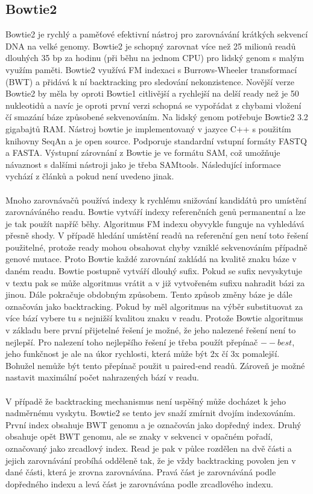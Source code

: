 \documentclass[czech,DP]{thesiskiv}
\numberwithin{equation}{section}
\begin{document}
\subsection{Bowtie2}
Bowtie2 je rychlý a paměťové efektivní nástroj pro zarovnávání krátkých sekvencí DNA na velké genomy. Bowtie2 je schopný zarovnat více než 25 milionů readů dlouhých 35 bp za hodinu (při běhu na jednom CPU) pro lidský genom s malým využím paměti. Bowtie2 využívá FM indexaci s Burrows-Wheeler transformací (BWT) a přidává k ní backtracking pro sledování nekonzistence. Novější verze Bowtie2 by měla by oproti Bowtie1 citlivější a rychlejší na delší ready než je 50 nukleotidů a navíc je oproti první verzi schopná se vypořádat z chybami vložení čí smazání báze způsobené sekvenováním. Na lidský genom potřebuje Bowtie2 3.2 gigabajtů RAM. Nástroj bowtie je implementovaný v jazyce C++ s použitím knihovny SeqAn a je open source. Podporuje standardní vstupní formáty FASTQ a FASTA.  Výstupní zárovnání z Bowtie je ve formátu SAM, což umožňuje návaznost s dalšími nástroji jako je třeba SAMtools. Následující informace vychází z článků \cite{bowtie} a \cite{bowtie2} pokud není uvedeno jinak.   
\\
\\
Mnoho zarovnávačů používá indexy k rychlému snižování kandidátů pro umístění zarovnáváného readu. Bowtie vytváří indexy referenčních genů permanentní a lze je tak použít napříč běhy. Algoritmus FM indexu obyvykle funguje na vyhledává přesně shody. V případě hledání umístění readů na referenční gen není toto řešení použitelné, protože ready mohou obsahovat chyby vzniklé sekvenováním případně genové mutace. Proto Bowtie každé zarovnání zakládá na kvalitě znaku báze v daném readu. Bowtie postupně vytváří dlouhý sufix. Pokud se sufix nevyskytuje v textu pak se může algoritmus vrátit a v již vytvořeném sufixu nahradit bázi za jinou. Dále pokračuje obdobným způsobem. Tento způsob změny báze je dále označován jako backtracking. Pokud by měl algoritmus na výběr substituovat za více bází vybere tu s nejnižší kvalitou znaku v readu. Protože Bowtie algoritmus v základu bere první přijetelné řešení je možné, že jeho nalezené řešení není to nejlepší. Pro nalezení toho nejlepšího řešení je třeba použít přepínač $--best$, jeho funkčnost je ale na úkor rychlosti, která může být 2x čí 3x pomalejší. Bohužel nemůže být tento přepínač použit u paired-end readů. Zároveň je možné nastavit maximální počet nahrazených bází v readu. \cite{bowtie}
\\
\\
V případě že backtracking mechanismus není uspěšný může docházet k jeho nadměrnému vyskytu. Bowtie2 se tento jev snaží zmírnit dvojím indexováním. První index obsahuje BWT genomu a je označován jako dopředný index. Druhý obsahuje opět BWT genomu, ale se znaky v sekvenci v opačném pořadí, označovaný jako zrcadlový index. Read je pak v půlce rozdělen na dvě části a jejich zarovnávání probíhá odděleně tak, že je vždy backtracking povolen jen v dané části, která je zrovna zarovnávána. Pravá část je zarovnáváná podle dopředného indexu a levá část je zarovnávána podle zrcadlového indexu. 
\end{document}

